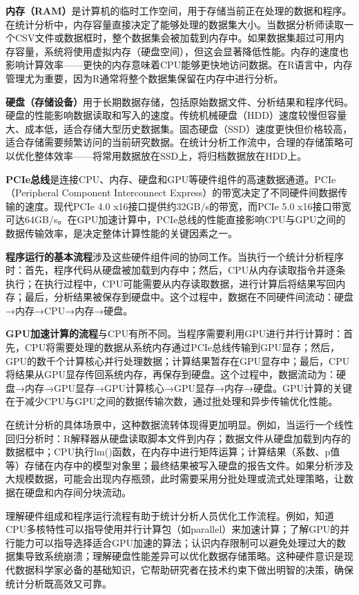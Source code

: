 \documentclass[
]{book}
\begin{document}
\textbf{内存（RAM）}是计算机的临时工作空间，用于存储当前正在处理的数据和程序。在统计分析中，内存容量直接决定了能够处理的数据集大小。当数据分析师读取一个CSV文件或数据框时，整个数据集会被加载到内存中。如果数据集超过可用内存容量，系统将使用虚拟内存（硬盘空间），但这会显著降低性能。内存的速度也影响计算效率------更快的内存意味着CPU能够更快地访问数据。在R语言中，内存管理尤为重要，因为R通常将整个数据集保留在内存中进行分析。

\textbf{硬盘（存储设备）}用于长期数据存储，包括原始数据文件、分析结果和程序代码。硬盘的性能影响数据读取和写入的速度。传统机械硬盘（HDD）速度较慢但容量大、成本低，适合存储大型历史数据集。固态硬盘（SSD）速度更快但价格较高，适合存储需要频繁访问的当前研究数据。在统计分析工作流中，合理的存储策略可以优化整体效率------将常用数据放在SSD上，将归档数据放在HDD上。

\textbf{PCIe总线}是连接CPU、内存、硬盘和GPU等硬件组件的高速数据通道。PCIe（Peripheral Component Interconnect Express）的带宽决定了不同硬件间数据传输的速度。现代PCIe 4.0 x16接口提供约32GB/s的带宽，而PCIe 5.0 x16接口带宽可达64GB/s。在GPU加速计算中，PCIe总线的性能直接影响CPU与GPU之间的数据传输效率，是决定整体计算性能的关键因素之一。

\textbf{程序运行的基本流程}涉及这些硬件组件间的协同工作。当执行一个统计分析程序时：首先，程序代码从硬盘被加载到内存中；然后，CPU从内存读取指令并逐条执行；在执行过程中，CPU可能需要从内存读取数据，进行计算后将结果写回内存；最后，分析结果被保存到硬盘中。这个过程中，数据在不同硬件间流动：硬盘→内存→CPU→内存→硬盘。

\textbf{GPU加速计算的流程}与CPU有所不同。当程序需要利用GPU进行并行计算时：首先，CPU将需要处理的数据从系统内存通过PCIe总线传输到GPU显存；然后，GPU的数千个计算核心并行处理数据；计算结果暂存在GPU显存中；最后，CPU将结果从GPU显存传回系统内存，再保存到硬盘。这个过程中，数据流动为：硬盘→内存→GPU显存→GPU计算核心→GPU显存→内存→硬盘。GPU计算的关键在于减少CPU与GPU之间的数据传输次数，通过批处理和异步传输优化性能。

在统计分析的具体场景中，这种数据流转体现得更加明显。例如，当运行一个线性回归分析时：R解释器从硬盘读取脚本文件到内存；数据文件从硬盘加载到内存的数据框中；CPU执行lm()函数，在内存中进行矩阵运算；计算结果（系数、p值等）存储在内存中的模型对象里；最终结果被写入硬盘的报告文件。如果分析涉及大规模数据，可能会出现内存瓶颈，此时需要采用分批处理或流式处理策略，让数据在硬盘和内存间分块流动。

理解硬件组成和程序运行流程有助于统计分析人员优化工作流程。例如，知道CPU多核特性可以指导使用并行计算包（如parallel）来加速计算；了解GPU的并行能力可以指导选择适合GPU加速的算法；认识内存限制可以避免处理过大的数据集导致系统崩溃；理解硬盘性能差异可以优化数据存储策略。这种硬件意识是现代数据科学家必备的基础知识，它帮助研究者在技术约束下做出明智的决策，确保统计分析既高效又可靠。
\end{document}
